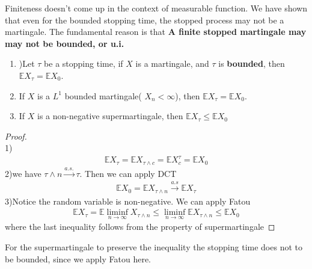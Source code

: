\begin{remark}
	Finiteness doesn't come up in the context of measurable function. We have shown that even for the bounded stopping time, the stopped process may not be a martingale. The fundamental reason is that \textbf{A finite stopped martingale may may not be bounded, or u.i.}
\end{remark}


\begin{corollary}\quad
\begin{enumerate}
	\item )Let $\tau$ be a stopping time, if $X$ is a martingale, and $\tau$ is \textbf{bounded}, then $\mathbb{E}X_\tau = \mathbb{E}X_0$.
	\item If $X$ is a $L^1$ bounded martingale( $X_n < \infty$), then $\mathbb{E}X_\tau = \mathbb{E}X_0$.
	\item If $X$ is a non-negative supermartingale, then $\mathbb{E} X_\tau \leq \mathbb{E} X_0$
\end{enumerate}
\end{corollary}

\begin{proof}\quad\\
	1)
	\begin{align*}
		\mathbb{E}X_\tau = \mathbb{E} X_{\tau \wedge c} = \mathbb{E}X^\tau_c = \mathbb{E} X_0
	\end{align*}
	2)we have $\tau \wedge n  \overset{a.s.}{\rightarrow} \tau$. Then we can apply DCT
	\begin{align*}
		\mathbb{E}X_0 = \mathbb{E} X_{\tau \wedge n} \overset{a.s}{\rightarrow} \mathbb{E} X_\tau
	\end{align*}
	3)Notice the random variable is non-negative. We can apply Fatou
	\begin{align*}
		\mathbb{E}X_\tau = \mathbb{E} \liminf_{n \rightarrow \infty} X_{\tau \wedge n} \leq \liminf_{n \rightarrow \infty} \mathbb{E} X_{\tau \wedge n} \leq \mathbb{E} X_0
	\end{align*}
	where the last inequality follows from the property of supermartingale 
\end{proof}
\begin{remark}
For the supermartingale to preserve the inequality the stopping time does not to be bounded, since we apply Fatou here.	
\end{remark}

